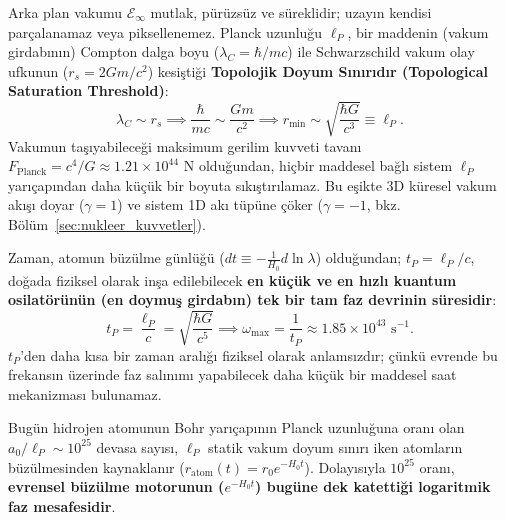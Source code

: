 \begin{theorem}
    \label{thm:planck_uzunlugu_doyum_main}
    Arka plan vakumu $\mathcal{E}_\infty$ mutlak, pürüzsüz ve süreklidir; uzayın kendisi parçalanamaz veya piksellenemez. Planck uzunluğu $\ell_P$, bir maddenin (vakum girdabının) Compton dalga boyu ($\lambda_C = \hbar/mc$) ile Schwarzschild vakum olay ufkunun ($r_s = 2Gm/c^2$) kesiştiği \textbf{Topolojik Doyum Sınırıdır (Topological Saturation Threshold)}:
    \begin{equation}
        \lambda_C \sim r_s \implies \frac{\hbar}{mc} \sim \frac{Gm}{c^2} \implies r_{\mathrm{min}} \sim \sqrt{\frac{\hbar G}{c^3}} \equiv \ell_P.
        \label{eq:planck_uzunluk_turetilis_main}
    \end{equation}
    Vakumun taşıyabileceği maksimum gerilim kuvveti tavanı $F_{\mathrm{Planck}} = c^4/G \approx 1.21 \times 10^{44}\text{ N}$ olduğundan, hiçbir maddesel bağlı sistem $\ell_P$ yarıçapından daha küçük bir boyuta sıkıştırılamaz. Bu eşikte 3D küresel vakum akışı doyar ($\gamma=1$) ve sistem 1D akı tüpüne çöker ($\gamma=-1$, bkz. Bölüm~\ref{sec:nukleer_kuvvetler}).
\end{theorem}

\begin{theorem}
    \label{thm:planck_zamani_frekans_main}
    Zaman, atomun büzülme günlüğü ($dt \equiv -\frac{1}{H_0} d\ln\lambda$) olduğundan; $t_P = \ell_P/c$, doğada fiziksel olarak inşa edilebilecek \textbf{en küçük ve en hızlı kuantum osilatörünün (en doymuş girdabın) tek bir tam faz devrinin süresidir}:
    \begin{equation}
        t_P = \frac{\ell_P}{c} = \sqrt{\frac{\hbar G}{c^5}} \implies \omega_{\mathrm{max}} = \frac{1}{t_P} \approx 1.85 \times 10^{43}\text{ s}^{-1}.
        \label{eq:planck_zamani_turetilis_main}
    \end{equation}
    $t_P$'den daha kısa bir zaman aralığı fiziksel olarak anlamsızdır; çünkü evrende bu frekansın üzerinde faz salınımı yapabilecek daha küçük bir maddesel saat mekanizması bulunamaz.
\end{theorem}

\begin{corollary}
    \label{cor:dirac_buyuk_sayilar_main}
    Bugün hidrojen atomunun Bohr yarıçapının Planck uzunluğuna oranı olan $a_0 / \ell_P \sim 10^{25}$ devasa sayısı, $\ell_P$ statik vakum doyum sınırı iken atomların büzülmesinden kaynaklanır ($r_{\mathrm{atom}}(t) = r_0 e^{-H_0 t}$). Dolayısıyla $10^{25}$ oranı, \textbf{evrensel büzülme motorunun ($e^{-H_0 t}$) bugüne dek katettiği logaritmik faz mesafesidir}.
\end{corollary}

